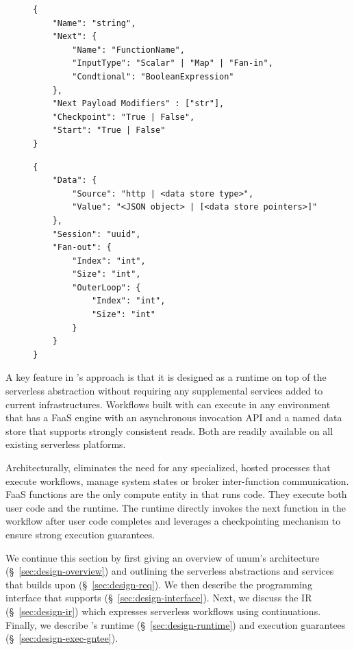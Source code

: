 \begin{figure}[]
    \begin{verbatim}
{
    "Name": "string",
    "Next": {
        "Name": "FunctionName",
        "InputType": "Scalar" | "Map" | "Fan-in",
        "Condtional": "BooleanExpression"
    },
    "Next Payload Modifiers" : ["str"],
    "Checkpoint": "True | False",
    "Start": "True | False"
}
    \end{verbatim}
    \caption{}
    \label{fig:unum-config-lang}
\end{figure}

\begin{figure}[]
    \begin{verbatim}
{
    "Data": {
        "Source": "http | <data store type>",
        "Value": "<JSON object> | [<data store pointers>]"
    },
    "Session": "uuid",
	"Fan-out": {
        "Index": "int",
        "Size": "int",
        "OuterLoop": {
            "Index": "int",
            "Size": "int"
        }
    }
}
    \end{verbatim}
    \caption{}
    \label{fig:input-format}
\end{figure}

A key feature in \name{}'s approach is that it is designed as a runtime on top
of the serverless abstraction without requiring any supplemental services
added to current infrastructures. Workflows built with \name{} can execute in
any environment that has a FaaS engine with an asynchronous invocation API and
a named data store that supports strongly consistent reads. Both are readily
available on all existing serverless platforms.

Architecturally, \name{} eliminates the need for any specialized, hosted
processes that execute workflows, manage system states or broker
inter-function communication. FaaS functions are the only compute entity in
\name{} that runs code. They execute both user code and the \name{} runtime. The
\name{} runtime directly invokes the next function in the workflow after user
code completes and leverages a checkpointing mechanism to ensure strong
execution guarantees.

We continue this section by first giving an overview of unum's architecture
(\S~\ref{sec:design-overview}) and outlining the serverless abstractions and
services that \name{} builds upon (\S~\ref{sec:design-req}). We then
describe the programming interface that \name{} supports
(\S~\ref{sec:design-interface}). Next, we discuss the \name{} IR
(\S~\ref{sec:design-ir}) which expresses serverless workflows using
continuations. Finally, we describe \name{}'s runtime
(\S~\ref{sec:design-runtime}) and execution guarantees
(\S~\ref{sec:design-exec-gntee}).

